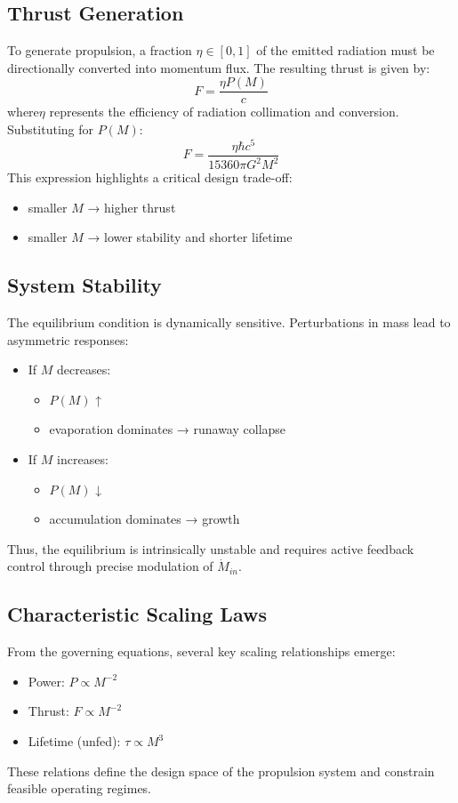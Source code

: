 \documentclass[conference]{IEEEtran}
\begin{document}
\subsection{Thrust Generation}
To generate propulsion, a fraction \( \eta\in[0,1] \) of the emitted radiation must be directionally converted into momentum flux. The resulting thrust is given by:
\begin{equation}
F = \frac{\eta P(M)}{c}
\end{equation}
where\( \eta \) represents the efficiency of radiation collimation and conversion.
Substituting for \( P(M) \):
\begin{equation}
F = \frac{\eta\hbar c^5}{15360\pi G^2M^2}
\end{equation}
This expression highlights a critical design trade-off:
\begin{itemize}
\item smaller \( M \) → higher thrust
\item smaller \( M \) → lower stability and shorter lifetime
\end{itemize}
\subsection{System Stability}
The equilibrium condition is dynamically sensitive. Perturbations in mass lead to asymmetric responses:
\begin{itemize}
\item If \( M \) decreases: \begin{itemize}\item \( P(M) \) ↑\item evaporation dominates → runaway collapse\end{itemize}
\item If \( M \) increases: \begin{itemize}\item \( P(M) \) ↓\item accumulation dominates → growth \end{itemize}
\end{itemize}
Thus, the equilibrium is intrinsically unstable and requires active feedback control through precise modulation of \( \dot{M}_{in} \).
\subsection{Characteristic Scaling Laws}
From the governing equations, several key scaling relationships emerge:
\begin{itemize}
\item Power: \( P\propto M^{-2} \)
\item Thrust: \( F\propto M^{-2} \)
\item Lifetime (unfed): \( \tau\propto M^{3} \)
\end{itemize}
These relations define the design space of the propulsion system and constrain feasible operating regimes.
\end{document}

